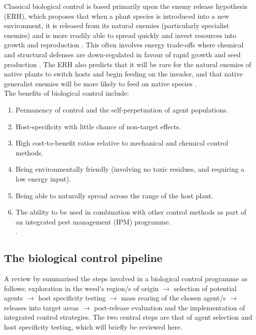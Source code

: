  \noindent Classical biological control is based primarily upon the enemy release hypothesis (ERH), which proposes that when a plant species is introduced into a new environment, it is released from its natural enemies (particularly specialist enemies) and is more readily able to spread quickly and invest resources into growth and reproduction \citep{keane2002exotic, mcevoy2002insect, liu2006testing}. This often involves energy trade-offs where chemical and structural defenses are down-regulated in favour of rapid growth and seed production \citep{blossey1995evolution, van1996optimal}. The ERH also predicts that it will be rare for the natural enemies of native plants to switch hosts and begin feeding on the invader, and that native generalist enemies will be more likely to feed on native species \citep{keane2002exotic}. \\
The benefits of biological control include: 
\vspace{0.4cm}
\begin{enumerate}
    \item Permanency of control and the self-perpetuation of agent populations.
    \item Host-specificity with little chance of non-target effects.
    \item High cost-to-benefit ratios relative to mechanical and chemical control methods.
    \item Being environmentally friendly (involving no toxic residues, and requiring a low energy input).
    \item Being able to naturally spread across the range of the host plant.
    \item The ability to be used in combination with other control methods as part of an integrated pest management (IPM) programme. \\
    \citep{hokannen1995, vanWilgen2004TheAfrica, culliney2005benefits, VanDriesche2009, zachariades2017assessing}.
\end{enumerate}

\subsection{The biological control pipeline}

A review by \citet{mcfadyen1998biological} summarised the steps involved in a biological control programme as follows: exploration in the weed's region/s of origin $\rightarrow$ selection of potential agents $\rightarrow$ host specificity testing $\rightarrow$ mass rearing of the chosen agent/s $\rightarrow$ releases into target areas $\rightarrow$ post-release evaluation and the implementation of integrated control strategies. The two central steps are that of agent selection and host specificity testing, which will briefly be reviewed here.


